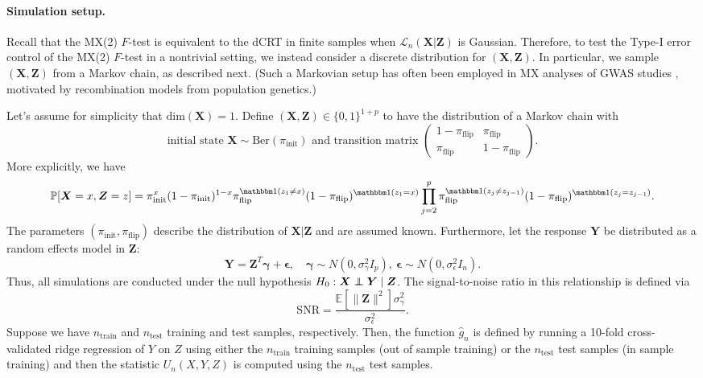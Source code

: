 \documentclass[12pt]{article}
\theoremstyle{definition}
\theoremstyle{remark}
\def\independenT#1#2{\mathrel{\rlap{$#1#2$}\mkern2mu{#1#2}}}
\newcommand\independent{\protect\mathpalette{\protect\independenT}{\perp}}
\newcommand{\eps}{\epsilon}
\newcommand{\prx}{\bm X}
\newcommand{\srx}{X}
\newcommand{\prz}{\bm Z}
\newcommand{\srz}{Z}
\newcommand{\pry}{{\bm Y}}
\newcommand{\sry}{Y}
\newcommand{\peps}{\bm \epsilon}
\begin{document}
\paragraph{Simulation setup.}

Recall that the MX(2) $F$-test is equivalent to the dCRT in finite samples when $\mathcal L_n(\prx|\prz)$ is Gaussian. Therefore, to test the Type-I error control of the MX(2) $F$-test in a nontrivial setting, we instead consider a discrete distribution for $(\prx,\prz)$. In particular, we sample $(\prx, \prz)$ from a Markov chain, as described next. (Such a Markovian setup has often been employed in MX analyses of GWAS studies \cite{SetC17, SetS19, Bates2020}, motivated by recombination models from population genetics.)

Let's assume for simplicity that $\text{dim}(\prx) = 1$. Define $(\prx,\prz) \in \{0,1\}^{1+p}$ to have the distribution of a Markov chain with 
\begin{equation*}
	\text{initial state } \prx \sim \text{Ber}(\pi_{\text{init}}) \text{ and transition matrix } \begin{pmatrix}1-\pi_\text{flip} & \pi_{\text{flip}} \\  \pi_{\text{flip}} &  1-\pi_{\text{flip}}\end{pmatrix}.
\end{equation*}
More explicitly, we have
\begin{equation*}
	\mathbb P[\prx = x, \prz = z] = \pi_{\text{init}}^{x}(1-\pi_{\text{init}})^{1-x} \pi_{\text{flip}}^{\mathbbm 1(z_1 \neq x)} (1-\pi_{\text{flip}})^{\mathbbm 1(z_1 = x)} \prod_{j = 2}^p \pi_{\text{flip}}^{\mathbbm 1(z_j \neq z_{j-1})} (1-\pi_{\text{flip}})^{\mathbbm 1(z_j = z_{j-1})}.
\end{equation*}
The parameters $(\pi_{\text{init}}, \pi_{\text{flip}})$ describe the distribution of $\prx|\prz$ and are assumed known. Furthermore, let the response $\pry$ be distributed as a random effects model in $\prz$:
\begin{equation*}
	\pry = \prz^T \bm \gamma + \peps, \quad \bm \gamma \sim N(0, \sigma^2_{\gamma}I_p),\ \peps \sim N(0, \sigma^2_\eps I_n).
\end{equation*}
Thus, all simulations are conducted under the null hypothesis $H_0: \prx \independent \pry \mid \prz$. The signal-to-noise ratio in this relationship is defined via
\begin{equation*}
	\text{SNR} = \frac{\mathbb E[\|\prz\|^2]\sigma^2_\gamma}{\sigma^2_\eps}.
\end{equation*}
Suppose we have $n_{\text{train}}$ and $n_{\text{test}}$ training and test samples, respectively. Then, the function $\widehat g_n$ is defined by running a 10-fold cross-validated ridge regression of $\sry$ on $\srz$ using either the $n_{\text{train}}$ training samples (out of sample training) or the $n_{\text{test}}$ test samples (in sample training) and then the statistic $U_n(\srx, \sry, \srz)$ is computed using the $n_{\text{test}}$ test samples.
\end{document}
